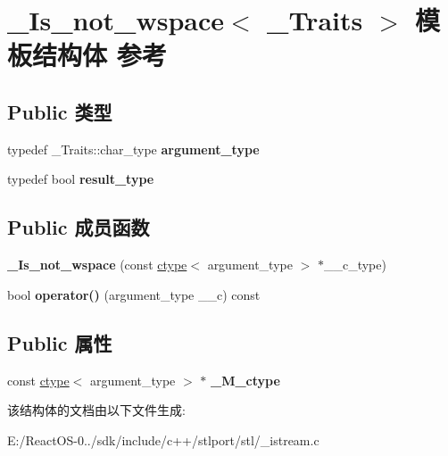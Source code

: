 \hypertarget{struct___is__not__wspace}{}\section{\+\_\+\+Is\+\_\+not\+\_\+wspace$<$ \+\_\+\+Traits $>$ 模板结构体 参考}
\label{struct___is__not__wspace}
\subsection*{Public 类型}
\begin{DoxyCompactItemize}
\item 
\mbox{\label{struct___is__not__wspace_a1ad15baa49fb3a2db743e0936023a348}} 
typedef \+\_\+\+Traits\+::char\+\_\+type {\bfseries argument\+\_\+type}
\item 
\mbox{\label{struct___is__not__wspace_aed401b38b286593734168e8a04c14d56}} 
typedef bool {\bfseries result\+\_\+type}
\end{DoxyCompactItemize}
\subsection*{Public 成员函数}
\begin{DoxyCompactItemize}
\item 
\mbox{\label{struct___is__not__wspace_a6bb63be4b9dc9e9b76d530d42e59136a}} 
{\bfseries \+\_\+\+Is\+\_\+not\+\_\+wspace} (const \hyperlink{classctype}{ctype}$<$ argument\+\_\+type $>$ $\ast$\+\_\+\+\_\+c\+\_\+type)
\item 
\mbox{\label{struct___is__not__wspace_ab93c696ed5cc03922604154a427d92ea}} 
bool {\bfseries operator()} (argument\+\_\+type \+\_\+\+\_\+c) const
\end{DoxyCompactItemize}
\subsection*{Public 属性}
\begin{DoxyCompactItemize}
\item 
\mbox{\label{struct___is__not__wspace_a29fe7f5b21b2f7af952928dd35c5b14f}} 
const \hyperlink{classctype}{ctype}$<$ argument\+\_\+type $>$ $\ast$ {\bfseries \+\_\+\+M\+\_\+ctype}
\end{DoxyCompactItemize}


该结构体的文档由以下文件生成\+:\begin{DoxyCompactItemize}
\item 
E\+:/\+React\+O\+S-\/0../sdk/include/c++/stlport/stl/\+\_\+istream.\+c\end{DoxyCompactItemize}
